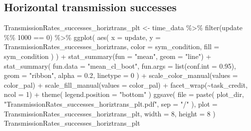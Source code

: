 \documentclass[
]{book}
\newenvironment{Shaded}{\begin{snugshade}}{\end{snugshade}}
\newcommand{\AttributeTok}[1]{\textcolor[rgb]{0.77,0.63,0.00}{#1}}
\newcommand{\DecValTok}[1]{\textcolor[rgb]{0.00,0.00,0.81}{#1}}
\newcommand{\FloatTok}[1]{\textcolor[rgb]{0.00,0.00,0.81}{#1}}
\newcommand{\FunctionTok}[1]{\textcolor[rgb]{0.00,0.00,0.00}{#1}}
\newcommand{\NormalTok}[1]{#1}
\newcommand{\OtherTok}[1]{\textcolor[rgb]{0.56,0.35,0.01}{#1}}
\newcommand{\SpecialCharTok}[1]{\textcolor[rgb]{0.00,0.00,0.00}{#1}}
\newcommand{\StringTok}[1]{\textcolor[rgb]{0.31,0.60,0.02}{#1}}
\begin{document}
\hypertarget{horizontal-transmission-successes-5}{%
\subsection{Horizontal transmission successes}\label{horizontal-transmission-successes-5}}

\begin{Shaded}
\begin{Highlighting}[]
\NormalTok{TransmissionRates\_successes\_horiztrans\_plt }\OtherTok{\textless{}{-}}\NormalTok{ time\_data }\SpecialCharTok{\%\textgreater{}\%}
  \FunctionTok{filter}\NormalTok{(update }\SpecialCharTok{\%\%} \DecValTok{1000} \SpecialCharTok{==} \DecValTok{0}\NormalTok{) }\SpecialCharTok{\%\textgreater{}\%}
  \FunctionTok{ggplot}\NormalTok{(}
    \FunctionTok{aes}\NormalTok{(}
      \AttributeTok{x =}\NormalTok{ update,}
      \AttributeTok{y =}\NormalTok{ TransmissionRates\_successes\_horiztrans,}
      \AttributeTok{color =}\NormalTok{ sym\_condition,}
      \AttributeTok{fill =}\NormalTok{ sym\_condition}
\NormalTok{    )}
\NormalTok{  ) }\SpecialCharTok{+}
  \FunctionTok{stat\_summary}\NormalTok{(}\AttributeTok{fun =} \StringTok{"mean"}\NormalTok{, }\AttributeTok{geom =} \StringTok{"line"}\NormalTok{) }\SpecialCharTok{+}
  \FunctionTok{stat\_summary}\NormalTok{(}
    \AttributeTok{fun.data =} \StringTok{"mean\_cl\_boot"}\NormalTok{,}
    \AttributeTok{fun.args =} \FunctionTok{list}\NormalTok{(}\AttributeTok{conf.int =} \FloatTok{0.95}\NormalTok{),}
    \AttributeTok{geom =} \StringTok{"ribbon"}\NormalTok{,}
    \AttributeTok{alpha =} \FloatTok{0.2}\NormalTok{,}
    \AttributeTok{linetype =} \DecValTok{0}
\NormalTok{  ) }\SpecialCharTok{+}
  \FunctionTok{scale\_color\_manual}\NormalTok{(}\AttributeTok{values =}\NormalTok{ color\_pal) }\SpecialCharTok{+}
  \FunctionTok{scale\_fill\_manual}\NormalTok{(}\AttributeTok{values =}\NormalTok{ color\_pal) }\SpecialCharTok{+}
  \FunctionTok{facet\_wrap}\NormalTok{(}\SpecialCharTok{\textasciitilde{}}\NormalTok{task\_credit, }\AttributeTok{ncol =} \DecValTok{1}\NormalTok{) }\SpecialCharTok{+}
  \FunctionTok{theme}\NormalTok{(}
    \AttributeTok{legend.position =} \StringTok{"bottom"}
\NormalTok{  )}
\FunctionTok{ggsave}\NormalTok{(}
  \AttributeTok{file =} \FunctionTok{paste}\NormalTok{(}
\NormalTok{    plot\_dir,}
    \StringTok{"TransmissionRates\_successes\_horiztrans\_plt.pdf"}\NormalTok{,}
    \AttributeTok{sep =} \StringTok{"/"}
\NormalTok{  ),}
  \AttributeTok{plot =}\NormalTok{ TransmissionRates\_successes\_horiztrans\_plt,}
  \AttributeTok{width =} \DecValTok{8}\NormalTok{,}
  \AttributeTok{height =} \DecValTok{8}
\NormalTok{)}
\NormalTok{TransmissionRates\_successes\_horiztrans\_plt}
\end{Highlighting}
\end{Shaded}
\end{document}
